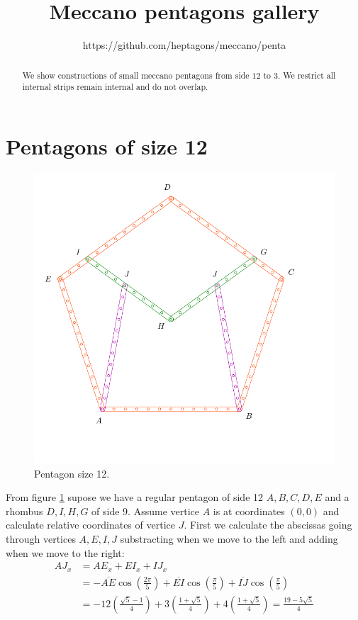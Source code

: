 \documentclass[11pt]{article}
\title{Meccano pentagons gallery}
\author{https://github.com/heptagons/meccano/penta}
\date{}
\begin{document}
\maketitle
\begin{abstract}
We show constructions of small meccano pentagons from side $12$ to $3$. We restrict all internal strips remain internal and do not overlap.
\end{abstract}

\section{Pentagons of size 12}

\begin{figure}[htp]
 \centering
 \includegraphics[scale=0.75]{gallery/penta12a}
 \caption{Pentagon size 12.}
 \label{fig:penta12a}
\end{figure}

From figure \ref{fig:penta12a} supose we have a regular pentagon of side 12 $A,B,C,D,E$ and a rhombus $D,I,H,G$ of side $9$. Assume vertice $A$ is at coordinates $(0,0)$ and calculate relative coordinates of vertice $J$. First we calculate the abscissas going through vertices $A,E,I,J$ substracting when we move to the left and adding when we move to the right:
\begin{align}
AJ_x &= AE_x + EI_x + IJ_x\\
 &= -\overline{AE}\cos\left(\frac{2\pi}5\right)
 + \overline{EI}\cos\left(\frac{\pi}5\right) 
 + \overline{IJ}\cos\left(\frac{\pi}5\right)\nonumber\\
 &= -12\left(\frac{\sqrt5 - 1}4\right)
  +3\left(\frac{1+\sqrt5}4\right)
  +4\left(\frac{1+\sqrt5}4\right) = \frac{19-5\sqrt5}4
\end{align}
\end{document}
